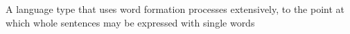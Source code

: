 A language type that uses word formation processes extensively, to the point at which whole sentences may be expressed with single words
